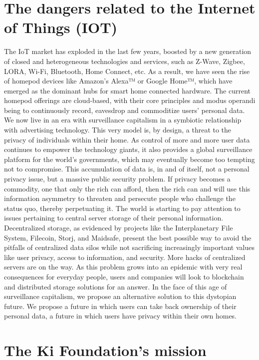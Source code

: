 \section{The dangers related to the Internet of Things (IOT)}
The IoT market has exploded in the last few years, boosted by a new generation of closed and heterogeneous technologies and services, such as Z-Wave, Zigbee, LORA, Wi-Fi, Bluetooth, Home Connect, etc. As a result, we have seen the rise of homepod devices like Amazon’s Alexa™ or Google Home™, which have emerged as the dominant hubs for smart home connected hardware. The current homepod offerings are cloud-based, with their core principles and modus operandi being to continuously record, eavesdrop and commoditize users’ personal data. We now live in an era with surveillance capitalism in a symbiotic relationship with advertising technology. This very model is, by design, a threat to the privacy of individuals within their home. As control of more and more user data continues to empower the technology giants, it also provides a global surveillance platform for the world’s governments, which may eventually become too tempting not to compromise. 
This accumulation of data is, in and of itself, not a personal privacy issue, but a massive public security problem. If privacy becomes a commodity, one that only the rich can afford, then the rich can and will use this information asymmetry to threaten and persecute people who challenge the status quo, thereby perpetuating it. The world is starting to pay attention to issues pertaining to central server storage of their personal information. Decentralized storage, as evidenced by projects like the Interplanetary File System, Filecoin, Storj, and Maidsafe, present the best possible way to avoid the pitfalls of centralized data silos while not sacrificing increasingly important values like user privacy, access to information, and security. More hacks of centralized servers are on the way. As this problem grows into an epidemic with very real consequences for everyday people, users and companies will look to blockchain and distributed storage solutions for an answer. 
In the face of this age of surveillance capitalism, we propose an alternative solution to this dystopian future. We propose a future in which users can take back ownership of their personal data, a future in which users have privacy within their own homes.

\section{The Ki Foundation’s mission}

